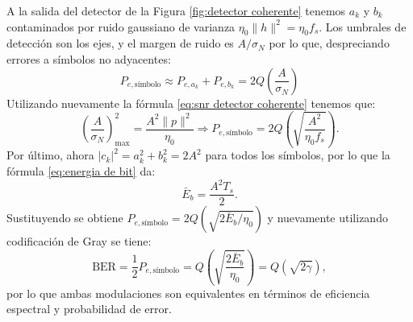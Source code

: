 \begin{ejemplo}
A la salida del detector de la Figura \ref{fig:detector coherente} tenemos $a_k$ y $b_k$ contaminados por ruido gaussiano de varianza $\eta_0 \|h\|^2 = \eta_0 f_s$. Los umbrales de detección son los ejes, y el margen de ruido es $A/\sigma_N$ por lo que, despreciando errores a símbolos no adyacentes:
\begin{equation*}
    P_{e,\text{símbolo}} \approx P_{e,a_k} + P_{e,b_k} = 2 Q\left(\frac{A}{\sigma_N}\right)
\end{equation*}
Utilizando nuevamente la fórmula \eqref{eq:snr detector coherente} tenemos que:
\begin{equation*}
    \left(\frac{A}{\sigma_N}\right)_{\max}^2 = \frac{A^2\|p\|^2}{\eta_0} \Rightarrow P_{e,\text{símbolo}} = 2Q\left(\sqrt{\frac{A^2}{\eta_0 f_s}}\right).
\end{equation*}
Por último, ahora $|c_k|^2 = a_k^2+b_k^2 = 2A^2$ para todos los símbolos, por lo que la fórmula \eqref{eq:energia de bit} da:
\begin{equation*}
    \bar{E}_b = \frac{A^2 T_s}{2}.
\end{equation*}
Sustituyendo se obtiene $P_{e,\text{símbolo}} = 2 Q\left(\sqrt{2\bar{E}_b/\eta_0}\right)$ y nuevamente utilizando codificación de Gray se tiene:
\begin{equation*}
    \mathrm{BER} = \frac{1}{2}P_{e,\text{símbolo}} = Q\left(\sqrt{\frac{2\bar{E}_b}{\eta_0}}\right) = Q\left(\sqrt{2\gamma}\right),
\end{equation*}
por lo que ambas modulaciones son equivalentes en términos de eficiencia espectral y probabilidad de error.
\end{ejemplo}



